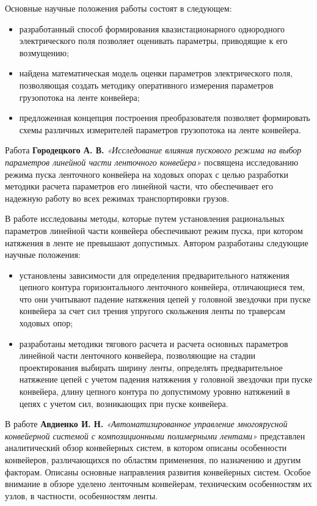 Основные научные положения работы состоят в следующем:
\begin{itemize}
\item разработанный способ формирования квазистационарного однородного электрического поля позволяет оценивать параметры, приводящие к его возмущению;
\item найдена математическая модель оценки параметров электрического поля, позволяющая создать методику оперативного измерения параметров грузопотока на ленте конвейера;
\item предложенная концепция построения преобразователя позволяет формировать схемы различных измерителей параметров грузопотока на ленте конвейера.
\end{itemize}

Работа \textbf{Городецкого А. В.} \textit{«Исследование влияния пускового режима на выбор параметров линейной части ленточного конвейера»} \cite{agorodetsky} посвящена исследованию режима пуска ленточного конвейера на ходовых опорах с целью разработки методики расчета параметров его линейной части, что обеспечивает его надежную работу во всех режимах транспортировки грузов. 

В работе исследованы методы, которые путем установления рациональных параметров линейной части конвейера обеспечивают режим пуска, при котором натяжения в ленте не превышают допустимых. Автором разработаны следующие научные положения:
\begin{itemize}
\item установлены зависимости для определения предварительного натяжения цепного контура горизонтального ленточного конвейера, отличающиеся тем, что они учитывают падение натяжения цепей у головной звездочки при пуске конвейера за счет сил трения упругого скольжения ленты по траверсам ходовых опор; 
\item разработаны методики тягового расчета и расчета основных параметров линейной части ленточного конвейера, позволяющие на стадии проектирования выбирать ширину ленты, определять предварительное натяжение цепей с учетом падения натяжения у головной звездочки при пуске конвейера, длину цепного контура по допустимому уровню натяжений в цепях с учетом сил, возникающих при пуске конвейера.
\end{itemize}

В работе \textbf{Авдиенко И. Н.} \textit{«Автоматизированное управление многоярусной конвейерной системой с композиционными полимерными лентами»} \cite{iavdienko} представлен аналитический обзор конвейерных систем, в котором описаны особенности конвейеров, различающихся по областям применения, по назначению и другим факторам. Описаны основные направления развития конвейерных систем.  Особое внимание в обзоре уделено ленточным конвейерам, техническим особенностям их узлов, в частности, особенностям ленты. 

